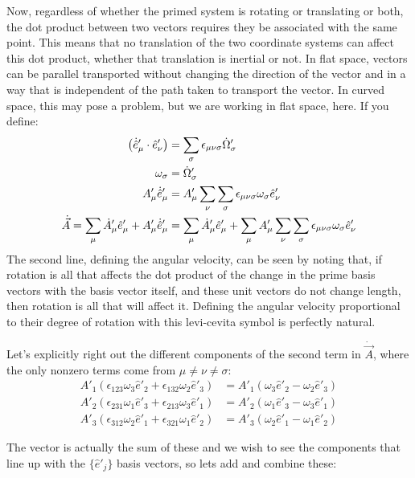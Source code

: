 \documentclass[10pt]{article}
\begin{document}
Now, regardless of whether the primed system is rotating or translating or 
both, the dot product between two vectors requires they be associated with the 
same point. 
This means that no translation of the two coordinate systems 
can affect this dot product, whether that translation is inertial or not. 
In flat space, vectors can be parallel transported without changing 
the direction of the vector and in a way that is independent of the path taken 
to transport the vector. In curved space, this may pose a problem, but we 
are working in flat space, here. 
If you define:
\begin{align}
    \left(\dot{\hat{e}}'_\mu\cdot\hat{e}'_\nu\right) 
        &= \sum_\sigma\epsilon_{\mu\nu\sigma}\dot{\Omega}'_\sigma \\
    \omega_\sigma &= \dot{\Omega}'_\sigma \notag\\
    A'_\mu\dot{\hat{e}}'_\mu &= A'_\mu\sum_\nu\sum_\sigma\epsilon_{\mu\nu\sigma}
        \omega_\sigma\hat{e}'_\nu\notag\\
    \dot{\vec{A}} = \sum_\mu \dot{A}'_\mu\hat{e}'_\mu + 
        A'_\mu\dot{\hat{e}}'_\mu &= \sum_\mu \dot{A}'_\mu\hat{e}'_\mu + 
           \sum_\mu A'_\mu\sum_\nu\sum_\sigma\epsilon_{\mu\nu\sigma}
            \omega_\sigma\hat{e}'_\nu
\end{align}
The second line, defining the angular velocity, can be seen by noting that, 
if rotation is all that affects the 
dot product of the change in the prime basis vectors with the basis vector 
itself, and these unit vectors do not change length, then rotation is 
all that will affect it. Defining the angular velocity proportional to 
their degree of rotation with this levi-cevita symbol is perfectly natural.

Let's explicitly right out the different components of the second term in 
$\dot{\vec{A}}$, where the only nonzero terms come from $\mu\neq\nu\neq\sigma$:
\begin{align*}
    A'_1(\epsilon_{123}\omega_3\hat{e}'_2 + \epsilon_{132}\omega_2\hat{e}'_3) 
        & = A'_1(\omega_3\hat{e}'_2 - \omega_2\hat{e}'_3) \\
    A'_2(\epsilon_{231}\omega_1\hat{e}'_3 + \epsilon_{213}\omega_3\hat{e}'_1) 
        & = A'_2(\omega_1\hat{e}'_3 - \omega_3\hat{e}'_1) \\
    A'_3(\epsilon_{312}\omega_2\hat{e}'_1 + \epsilon_{321}\omega_1\hat{e}'_2) 
        & = A'_3(\omega_2\hat{e}'_1 - \omega_1\hat{e}'_2) 
\end{align*}

The vector is actually the sum of these and we wish to see the components 
that line up with the $\{\hat{e}'_j\}$ basis vectors, so lets add and combine 
these:
\end{document}
